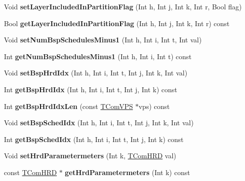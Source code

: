 \begin{DoxyCompactItemize}
Void {\bfseries set\+Layer\+Included\+In\+Partition\+Flag} (Int h, Int j, Int k, Int r, Bool flag)
\item 
\mbox{\label{class_t_com_vps_vui_bsp_hrd_parameters_af2fdf22dedcc18a255b7b1c235488729}} 
Bool {\bfseries get\+Layer\+Included\+In\+Partition\+Flag} (Int h, Int j, Int k, Int r) const
\item 
\mbox{\label{class_t_com_vps_vui_bsp_hrd_parameters_a65bc0bf065c794ee1932285d7c2d1a0a}} 
Void {\bfseries set\+Num\+Bsp\+Schedules\+Minus1} (Int h, Int i, Int t, Int val)
\item 
\mbox{\label{class_t_com_vps_vui_bsp_hrd_parameters_a0acbd571416c2fdeadba9177cc8792a3}} 
Int {\bfseries get\+Num\+Bsp\+Schedules\+Minus1} (Int h, Int i, Int t) const
\item 
\mbox{\label{class_t_com_vps_vui_bsp_hrd_parameters_aed79ce30b26452af7bb6c09d51daf706}} 
Void {\bfseries set\+Bsp\+Hrd\+Idx} (Int h, Int i, Int t, Int j, Int k, Int val)
\item 
\mbox{\label{class_t_com_vps_vui_bsp_hrd_parameters_a05fe23f81a07117711187e9babcaac7d}} 
Int {\bfseries get\+Bsp\+Hrd\+Idx} (Int h, Int i, Int t, Int j, Int k) const
\item 
\mbox{\label{class_t_com_vps_vui_bsp_hrd_parameters_a98bee9a7969c03c486cc601b01879e17}} 
Int {\bfseries get\+Bsp\+Hrd\+Idx\+Len} (const \hyperlink{class_t_com_v_p_s}{T\+Com\+V\+PS} $\ast$vps) const
\item 
\mbox{\label{class_t_com_vps_vui_bsp_hrd_parameters_a4d07a26e2d625895f7e95abc8d37133f}} 
Void {\bfseries set\+Bsp\+Sched\+Idx} (Int h, Int i, Int t, Int j, Int k, Int val)
\item 
\mbox{\label{class_t_com_vps_vui_bsp_hrd_parameters_adcc9e7471ff9dac004620134e7ae767a}} 
Int {\bfseries get\+Bsp\+Sched\+Idx} (Int h, Int i, Int t, Int j, Int k) const
\item 
\mbox{\label{class_t_com_vps_vui_bsp_hrd_parameters_a95f43336aef14aff1ec30ca53191fcfa}} 
Void {\bfseries set\+Hrd\+Parametermeters} (Int k, \hyperlink{class_t_com_h_r_d}{T\+Com\+H\+RD} val)
\item 
\mbox{\label{class_t_com_vps_vui_bsp_hrd_parameters_a1c9fc8d4a3e72d46f1690a398654f183}} 
const \hyperlink{class_t_com_h_r_d}{T\+Com\+H\+RD} $\ast$ {\bfseries get\+Hrd\+Parametermeters} (Int k) const
\end{DoxyCompactItemize}


